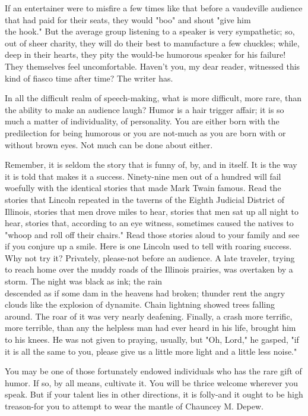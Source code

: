 \documentclass[10pt]{article}
\begin{document}
If an entertainer were to misfire a few times like that before a vaudeville audience that had paid for their seats, they would "boo" and shout "give him\\
the hook." But the average group listening to a speaker is very sympathetic; so, out of sheer charity, they will do their best to manufacture a few chuckles; while, deep in their hearts, they pity the would-be humorous speaker for his failure! They themselves feel uncomfortable. Haven't you, my dear reader, witnessed this kind of fiasco time after time? The writer has.

In all the difficult realm of speech-making, what is more difficult, more rare, than the ability to make an audience laugh? Humor is a hair trigger affair; it is so much a matter of individuality, of personality. You are either born with the predilection for being humorous or you are not-much as you are born with or without brown eyes. Not much can be done about either.

Remember, it is seldom the story that is funny of, by, and in itself. It is the way it is told that makes it a success. Ninety-nine men out of a hundred will fail woefully with the identical stories that made Mark Twain famous. Read the stories that Lincoln repeated in the taverns of the Eighth Judicial District of Illinois, stories that men drove miles to hear, stories that men sat up all night to hear, stories that, according to an eye witness, sometimes caused the natives to "whoop and roll off their chairs." Read those stories aloud to your family and see if you conjure up a smile. Here is one Lincoln used to tell with roaring success. Why not try it? Privately, please-not before an audience. A late traveler, trying to reach home over the muddy roads of the Illinois prairies, was overtaken by a storm. The night was black as ink; the rain\\
descended as if some dam in the heavens had broken; thunder rent the angry clouds like the explosion of dynamite. Chain lightning showed trees falling around. The roar of it was very nearly deafening. Finally, a crash more terrific, more terrible, than any the helpless man had ever heard in his life, brought him to his knees. He was not given to praying, usually, but "Oh, Lord," he gasped, "if it is all the same to you, please give us a little more light and a little less noise."

You may be one of those fortunately endowed individuals who has the rare gift of humor. If so, by all means, cultivate it. You will be thrice welcome wherever you speak. But if your talent lies in other directions, it is folly-and it ought to be high treason-for you to attempt to wear the mantle of Chauncey M. Depew.
\end{document}
